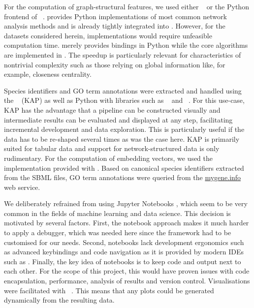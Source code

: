\documentclass[
	fontsize=10pt, %
	twoside=true, %
	secnumdepth=1, %
  toc=indentunnumbered %
]{kaobook}
\begin{document}
For the computation of graph-structural features, we used either
~\cite{hagberg_ExploringNetworkStructure_2008} or the Python
frontend of ~\cite{csardi_IgraphSoftwarePackage_}.
 provides Python implementations of most common network
analysis methods and is already tightly integrated into .
However, for the datasets considered herein,  implementations
would require unfeasible computation time.  merely provides
bindings in Python while the core algorithms are implemented in . The
speedup is particularly relevant for characteristics of nontrivial complexity
such as those relying on global information like, for example, closeness
centrality.

Species identifiers and GO term annotations were extracted and handled using the
~\cite{gesellschaftfuerklassifikation_DataAnalysisMachine_2008} (KAP)
as well as Python with libraries such as
~\cite{reback_PandasdevPandasPandas_2021} and
~\cite{harris_ArrayProgrammingNumPy_2020}. For this use-case,
KAP has the advantage that a pipeline can be constructed visually and
intermediate results can be evaluated and displayed at any step, facilitating
incremental development and data exploration. This is particularly useful if the
data has to be re-shaped several times as was the case here. KAP is primarily
suited for tabular data and support for network-structured data is only
rudimentary. For the computation of embedding vectors, we used the
 implementation provided with . Based on
canonical species identifiers extracted from the SBML files, GO term annotations
were queried from the \href{https://mygene.info/}{mygene.info} web service. 

We deliberately refrained from using Jupyter Notebooks
\cite{kluyver_JupyterNotebooksPublishing_2016}, which seem to be very common in
the fields of machine learning and data science. This decision is motivated by
several factors. First, the notebook approach makes it much harder to apply a
debugger, which was needed here since the  framework had to
be customised for our needs. Second, notebooks lack development ergonomics such
as advanced keybindings and code navigation as it is provided by modern IDEs
such as . Finally, the key idea of notebooks is to keep code and
output next to each other. For the scope of this project, this would have proven
issues with code encapsulation, performance, analysis of results and version
control.
Visualisations were facilitated with
~\cite{caswell_MatplotlibMatplotlibREL_2021}. This means that
any plots could be generated dynamically from the resulting data.
\end{document}
